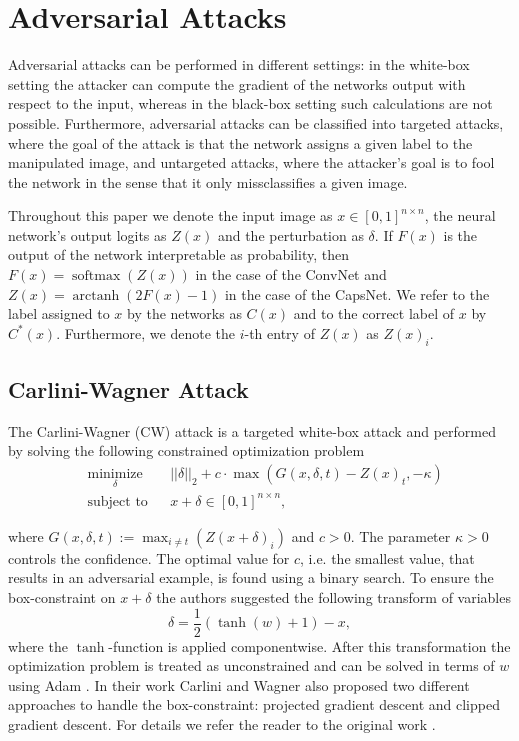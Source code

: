 \documentclass{article}
\DeclareMathOperator\arctanh{arctanh}
\DeclareMathOperator\softmax{softmax}
\begin{document}
\section{Adversarial Attacks}
\label{lab:attacks}

Adversarial attacks can be performed in different settings: in the white-box setting the attacker can compute the gradient of the networks output with respect to the input, whereas in the black-box setting such calculations are not possible. Furthermore, adversarial attacks can be classified into targeted attacks, where the goal of the attack is that the network assigns a given label to the manipulated image, and untargeted attacks, where the attacker's goal is to fool the network in the sense that it only missclassifies a given image.

Throughout this paper we denote the input image as $x\in [0,1]^{n\times n}$, the neural network's output logits as $Z(x)$ and the perturbation as $\delta$. If $F(x)$ is the output of the network interpretable as probability, then
$F(x) = \softmax (Z(x))$ in the case of the ConvNet and $Z(x) = \arctanh(2F(x) - 1)$ in the case of the CapsNet. We refer to the label assigned to $x$ by the networks as $C(x)$  and to the correct label of $x$ by $C^*(x)$. Furthermore, we denote the $i$-th entry of $Z(x)$ as $Z(x)_i$.

\subsection{Carlini-Wagner Attack}

The Carlini-Wagner (CW) attack  is a targeted white-box attack and performed by solving the following constrained optimization problem
\begin{equation}
\begin{aligned}
& \underset{\delta}{\text{minimize}}
& & ||\delta||_2 + c \cdot \max(G(x,\delta,t)-Z(x)_t, -\kappa) \\
& \text{subject to}
& & x+\delta \in [0,1]^{n \times n},
\end{aligned}
\end{equation}

where $G(x,\delta,t) := \max_{i\neq t}(Z(x+\delta)_i)$ and $c>0$. The parameter  $\kappa > 0$ controls the confidence. The optimal value for $c$, i.e. the smallest value, that results in an adversarial example, is found using a binary search. To ensure the box-constraint on $x+\delta$ the authors suggested the following transform of variables 
\begin{equation}
\delta = \frac{1}{2}(\tanh(w)+1)-x,
\end{equation} 
where the $\tanh$-function is applied componentwise. After this transformation the optimization problem is treated as unconstrained and can be solved in terms of $w$ using Adam \cite{adam}. In their work Carlini and Wagner also proposed two different approaches to handle the box-constraint: projected gradient descent and clipped gradient descent. For details we refer the reader to the original work \cite{carlini}.
\end{document}
